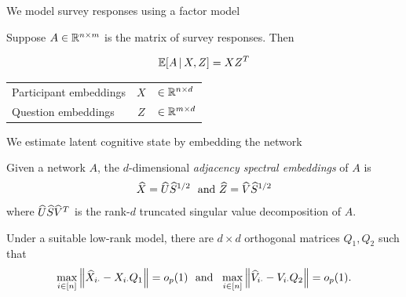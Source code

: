 \documentclass[aspectratio=169]{beamer}
\theoremstyle{remark}
\begin{document}
\begin{frame}{We model survey responses using a factor model}

    Suppose $A \in \mathbb{R}^{n \times m}$ is the matrix of survey responses. Then

    \begin{equation*}
        \E[X, Z]{A} = X Z^T
    \end{equation*}

    \begin{table}[]
        \begin{tabular}{lcl}
            Participant embeddings & $X$ & $\in \mathbb{R}^{n \times d}$ \\
            Question embeddings    & $Z$ & $\in \mathbb{R}^{m \times d}$
        \end{tabular}
    \end{table}

\end{frame}

\begin{frame}{We estimate latent cognitive state by embedding the network}

    \begin{definition}[ASE]

        Given a network $A$, the $d$-dimensional \emph{adjacency spectral embeddings} of $A$ is
        \begin{align*}
            \widehat{X} = \widehat{U} \widehat{S}^{1/2} ~\text{ and } \widehat{Z} = \widehat{V} \widehat{S}^{1/2}
        \end{align*}
        \noindent where $\widehat{U} \widehat{S} \widehat{V}^T$ is the rank-$d$ truncated singular value decomposition of $A$.
    \end{definition}

    \begin{lemma}
        Under a suitable low-rank model, there are $d \times d$ orthogonal matrices $Q_1, Q_2$ such that
        \begin{equation*}
            \max_{i \in [n]} \, \norm*{\Xhat_{i \cdot} - \X_{i \cdot} Q_1} = \op{1}
            ~\text{ and }~
            \max_{i \in [n]} \, \norm*{\Vhat_{i \cdot} - V_{i \cdot} Q_2} = \op{1}.
        \end{equation*}
    \end{lemma}
\end{frame}
\end{document}
